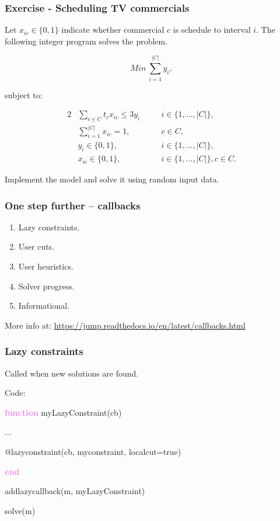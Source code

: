\documentclass{beamer}
\begin{document}
\begin{frame}
  \frametitle{Exercise - Scheduling TV commercials}

  \footnotesize

  Let $x_{ic} \in \{0, 1\}$ indicate whether commercial $c$ is schedule to interval $i$. The following integer program solves the problem.
  
  \begin{equation*}
  Min\ \sum_{i=1}^{|C|} y_i,
  \end{equation*}

  subject to:

  \vspace{-0.7cm}
  \begin{alignat*}{2}
    &\sum_{c \in C} t_c x_{ic} \leq 3 y_i && \quad i \in \{1, \ldots, |C|\},\\
    & \sum_{i=1}^{|C|} x_{ic} = 1, && \quad c \in C,\\
    & y_i \in \{0, 1\}, && \quad i \in \{1, \ldots, |C|\},\\
    & x_{ic} \in \{0, 1\}, && \quad i \in \{1, \ldots, |C|\}, c \in C. 
  \end{alignat*}

Implement the model and solve it using random input data.
  
\end{frame}


\begin{frame}
  \frametitle{One step further -- callbacks}

  \begin{enumerate}
  \item [] Lazy constraints.
  \item [] User cuts.
  \item [] User heuristics.
  \item [] Solver progress.
  \item [] Informational.
  \end{enumerate}

    \vfill \footnotesize
  More info at: \url{https://jump.readthedocs.io/en/latest/callbacks.html}
\end{frame}


\begin{frame}
  \frametitle{Lazy constraints}
  Called when new solutions are found.

  \begin{block}{Code:}\footnotesize
    
    \textcolor{violet}{\textbf{function}} myLazyConstraint(cb)
    
    \hspace{1cm}    ...
    
    \hspace{1cm}    @lazyconstraint(cb, myconstraint, localcut=true)

    \textcolor{violet}{\bf end}
    
    addlazycallback(m, myLazyConstraint)

    solve(m)
  \end{block}

\end{frame}
\end{document}

